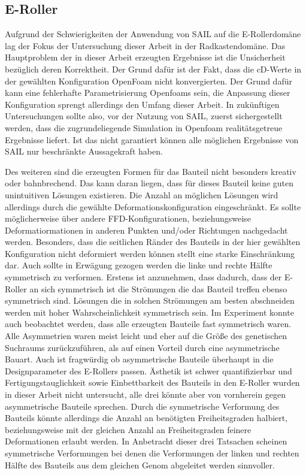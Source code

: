 \subsection{E-Roller}

Aufgrund der Schwierigkeiten der Anwendung von SAIL auf die E-Rollerdomäne lag der Fokus der Untersuchung dieser Arbeit in der Radkastendomäne.
Das Hauptproblem der in dieser Arbeit erzeugten Ergebnisse ist die Unsicherheit bezüglich deren Korrektheit.
Der Grund dafür ist der Fakt, dass die cD-Werte in der gewählten Konfiguration OpenFoam nicht konvergierten.
Der Grund dafür kann eine fehlerhafte Parametrisierung Openfoams sein, die Anpassung dieser Konfiguration sprengt allerdings den Umfang dieser Arbeit.
In zukünftigen Untersuchungen sollte also, vor der Nutzung von SAIL, zuerst sichergestellt werden, dass die zugrundeliegende Simulation in Openfoam realitätsgetreue Ergebnisse liefert.
Ist das nicht garantiert können alle möglichen Ergebnisse von SAIL nur beschränkte Aussagekraft haben.

Des weiteren sind die erzeugten Formen für das Bauteil nicht besonders kreativ oder bahnbrechend.
Das kann daran liegen, dass für dieses Bauteil keine guten unintuitiven Lösungen existieren.
Die Anzahl an möglichen Lösungen wird allerdings durch die gewählte Deformationskonfiguration eingeschränkt.
Es sollte möglicherweise über andere FFD-Konfigurationen, beziehungsweise Deformatiormationen in anderen Punkten und/oder Richtungen nachgedacht werden.
Besonders, dass die seitlichen Ränder des Bauteils in der hier gewählten Konfiguration nicht deformiert werden können stellt eine starke Einschränkung dar.
Auch sollte in Erwägung gezogen werden die linke und rechte Hälfte symmetrisch zu verformen.
Erstens ist anzunehmen, dass dadurch, dass der E-Roller an sich symmetrisch ist die Strömungen die das Bauteil treffen ebenso symmetrisch sind.
Lösungen die in solchen Strömungen am besten abschneiden werden mit hoher Wahrscheinlichkeit symmetrisch sein.
Im Experiment konnte auch beobachtet werden, dass alle erzeugten Bauteile fast symmetrisch waren.
Alle Asymmetrien waren meist leicht und eher auf die Größe des genetischen Suchraums zurückzuführen, als auf einen Vorteil durch eine asymmetrische Bauart.
Auch ist fragwürdig ob  asymmetrische Bauteile überhaupt in die Designparameter des E-Rollers passen.
Ästhetik ist schwer quantifizierbar und Fertigungstauglichkeit sowie Einbettbarkeit des Bauteils in den E-Roller wurden in dieser Arbeit nicht untersucht, alle drei könnte aber von vornherein gegen asymmetrische Bauteile sprechen.
Durch die symmetrische Verformung des Bauteils könnte allerdings die Anzahl an benötigten Freiheitsgraden halbiert, beziehungsweise mit der gleichen Anzahl an Freiheitsgraden feinere Deformationen erlaubt werden.
In Anbetracht dieser drei Tatsachen scheinen symmetrische Verformungen bei denen die Verformungen der linken und rechten Hälfte des Bauteils aus dem gleichen Genom abgeleitet werden sinnvoller.


